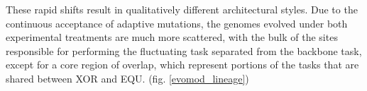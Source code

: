 These rapid shifts result in qualitatively different architectural styles. Due to the continuous acceptance of adaptive mutations, the genomes evolved under both experimental treatments are much more scattered, with the bulk of the sites responsible for performing the fluctuating task separated from the backbone task, except for a core region of overlap, which represent portions of the tasks that are shared between XOR and EQU. (fig. \ref{evomod_lineage})
